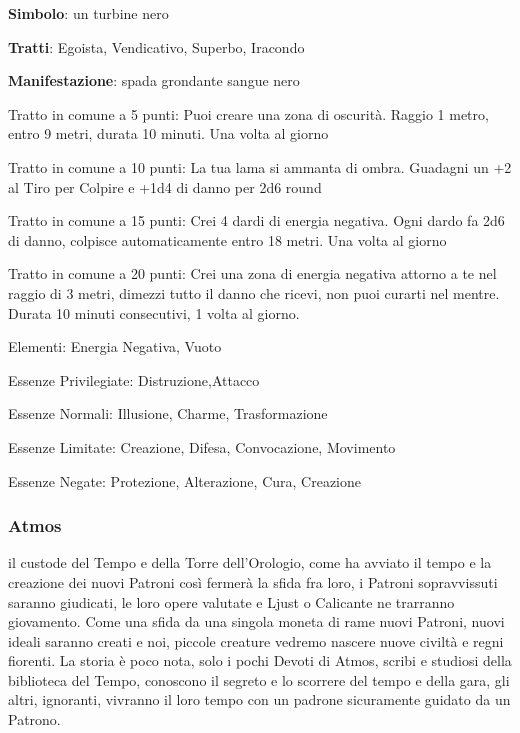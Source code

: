 \documentclass[a4paper,11pt,twoside,openany]{book}
\begin{document}
\textbf{Simbolo}: un turbine nero

\textbf{Tratti}: Egoista, Vendicativo, Superbo, Iracondo

\textbf{Manifestazione}: spada grondante sangue nero

\bigskip

Tratto in comune a 5 punti: Puoi creare una zona di oscurità. Raggio 1 metro, entro 9 metri, durata 10 minuti. Una volta al giorno

Tratto in comune a 10 punti: La tua lama si ammanta di ombra. Guadagni un +2 al Tiro per Colpire e +1d4 di danno per 2d6 round

Tratto in comune a 15 punti: Crei 4 dardi di energia negativa. Ogni dardo fa 2d6 di danno, colpisce automaticamente entro 18 metri. Una volta al giorno

Tratto in comune a 20 punti: Crei una zona di energia negativa attorno a te nel raggio di 3 metri, dimezzi tutto il danno che ricevi, non puoi curarti nel mentre. Durata 10 minuti consecutivi, 1 volta al giorno.

\bigskip

Elementi: Energia Negativa, Vuoto

\bigskip

Essenze Privilegiate: Distruzione,Attacco

Essenze Normali: Illusione, Charme, Trasformazione

Essenze Limitate: Creazione, Difesa, Convocazione, Movimento

Essenze Negate: Protezione, Alterazione, Cura, Creazione

\subsubsection{Atmos}

\label{atmos}

il custode del Tempo e della Torre dell'Orologio, come ha avviato il tempo e la creazione dei nuovi Patroni così fermerà la sfida fra loro, i Patroni sopravvissuti saranno giudicati, le loro opere valutate e Ljust o Calicante ne trarranno giovamento. Come una sfida da una singola moneta di rame nuovi Patroni, nuovi ideali saranno creati e noi, piccole creature vedremo nascere nuove civiltà e regni fiorenti. La storia è poco nota, solo i pochi Devoti di Atmos, scribi e studiosi della biblioteca del Tempo, conoscono il segreto e lo scorrere del tempo e della gara, gli altri, ignoranti, vivranno il loro tempo con un padrone sicuramente guidato da un Patrono.
\end{document}
